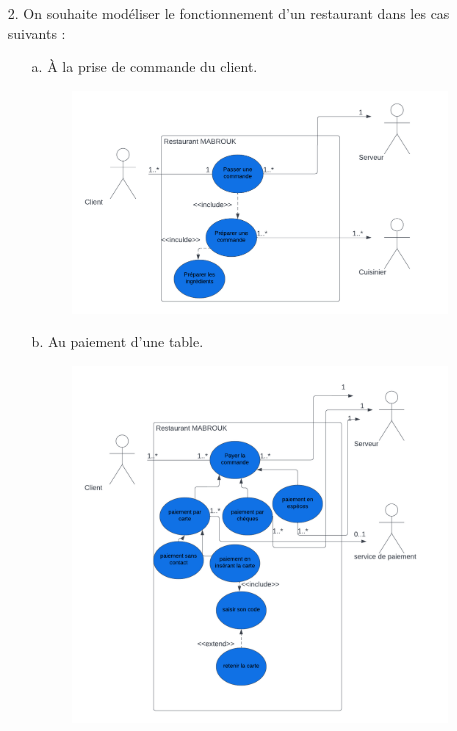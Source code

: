 \documentclass[12pt]{article}
\begin{document}
\begin{itemize}
\begin{itemize}
\begin{figure}[!hbtp]
			\end{figure}
		\end{itemize}
	\item[2. ] On souhaite modéliser le fonctionnement d’un restaurant dans les cas suivants :
	\begin{itemize}
		\item[a. ] À la prise de commande du client.
			\begin{figure}[!hbtp]
			\includegraphics[scale=0.75]{capture3_1.png}
		\end{figure}
	\newpage
		\item[b. ] Au paiement d’une table.
	
		\begin{figure}[!hbtp]
			\includegraphics[scale=0.75]{capture_4_1.png}
		\end{figure}
	\end{itemize}
	\end{itemize}
\end{document}
